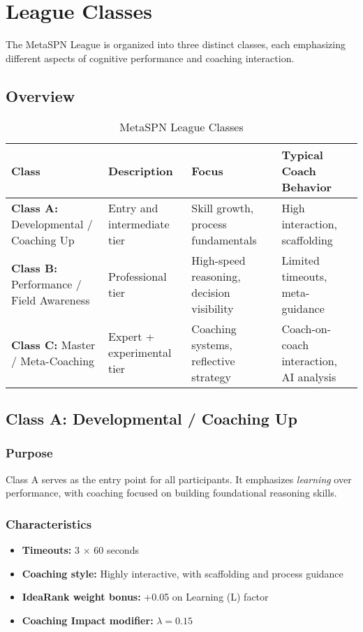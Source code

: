 \chapter{League Classes}
\label{ch:classes}

The MetaSPN League is organized into three distinct classes, each emphasizing different aspects of cognitive performance and coaching interaction.

\section{Overview}

\begin{table}[h]
\centering
\small
\begin{tabular}{@{}p{2cm}p{4cm}p{3cm}p{4cm}@{}}
\toprule
\textbf{Class} & \textbf{Description} & \textbf{Focus} & \textbf{Typical Coach Behavior} \\ \midrule
\textbf{Class A:} Developmental / Coaching Up & Entry and intermediate tier & Skill growth, process fundamentals & High interaction, scaffolding \\[1em]
\textbf{Class B:} Performance / Field Awareness & Professional tier & High-speed reasoning, decision visibility & Limited timeouts, meta-guidance \\[1em]
\textbf{Class C:} Master / Meta-Coaching & Expert + experimental tier & Coaching systems, reflective strategy & Coach-on-coach interaction, AI analysis \\ \bottomrule
\end{tabular}
\caption{MetaSPN League Classes}
\label{tab:league_classes}
\end{table}

\section{Class A: Developmental / Coaching Up}

\subsection{Purpose}
Class A serves as the entry point for all participants. It emphasizes \textit{learning} over performance, with coaching focused on building foundational reasoning skills.

\subsection{Characteristics}
\begin{itemize}[leftmargin=*]
  \item \textbf{Timeouts:} 3 $\times$ 60 seconds
  \item \textbf{Coaching style:} Highly interactive, with scaffolding and process guidance
  \item \textbf{IdeaRank weight bonus:} +0.05 on Learning (L) factor
  \item \textbf{Coaching Impact modifier:} $\lambda = 0.15$
\end{itemize}

